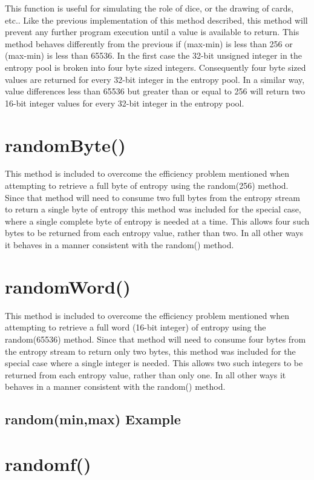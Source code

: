 \documentclass[10pt]{report}
\newcommand{\code}[2]{
 \hrulefill
 \subsection*{#1}
 
 \vspace{2em}
}
\begin{document}
This function is useful for simulating the role of dice, or the drawing of cards, etc..  Like the previous 
implementation of this method described, this method will prevent any further program execution until a value 
is available to return.  This method behaves differently from the previous if (max-min) is less than 256 or 
(max-min) is less than 65536.  In the first case the 32-bit unsigned integer in the entropy pool is broken 
into four byte sized integers. Consequently four byte sized values are returned for every 32-bit integer in 
the entropy pool.  In a similar way, value differences less than 65536 but greater than or equal to 256 will 
return two 16-bit integer values for every 32-bit integer in the entropy pool. 

\section{randomByte()} 

This method is included to overcome the efficiency problem mentioned when attempting to retrieve a full byte 
of entropy using the random(256) method.  Since that method will need to consume two full bytes from the 
entropy stream to return a single byte of entropy this method was included for the special case, where a 
single complete byte of entropy is needed at a time.  This allows four such bytes to be returned from each 
entropy value, rather than two.  In all other ways it behaves in a manner consistent with the random() 
method.

\section{randomWord()}

This method is included to overcome the efficiency problem mentioned when attempting to retrieve a full word 
(16-bit integer) of entropy using the random(65536) method.  Since that method will need to consume four bytes 
from the entropy stream to return only two bytes, this method was included for the special case where a single 
integer is needed.  This allows two such integers to be returned from each entropy value, rather than only 
one.  In all other ways it behaves in a manner consistent with the random() method.

\code{random(min,max) Example}{random_minmax_example.ino}

\section{randomf()}
\end{document}
